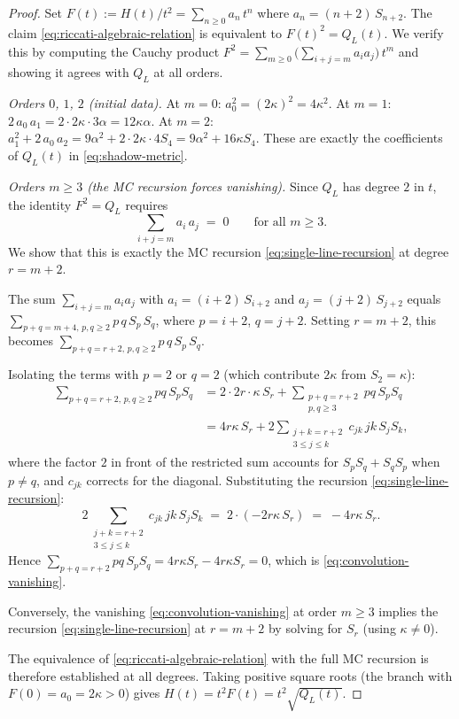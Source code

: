 \documentclass[11pt]{article}
\theoremstyle{plain}
\theoremstyle{definition}
\theoremstyle{remark}
\begin{document}
\begin{proof}
Set $F(t) := H(t)/t^2 = \sum_{n \geq 0} a_n \, t^n$ where
$a_n = (n+2)\, S_{n+2}$.
The claim \eqref{eq:riccati-algebraic-relation} is equivalent to
$F(t)^2 = Q_L(t)$. We verify this by computing the Cauchy
product $F^2 = \sum_{m \geq 0} \bigl(\sum_{i+j=m} a_i a_j\bigr)
\, t^m$ and showing it agrees with $Q_L$ at all orders.

\emph{Orders $0$, $1$, $2$ (initial data).}
At $m = 0$: $a_0^2 = (2\kappa)^2 = 4\kappa^2$.
At $m = 1$: $2\,a_0\,a_1 = 2 \cdot 2\kappa \cdot 3\alpha = 12\kappa\alpha$.
At $m = 2$: $a_1^2 + 2\,a_0\,a_2 = 9\alpha^2 + 2 \cdot 2\kappa \cdot 4S_4
= 9\alpha^2 + 16\kappa S_4$.
These are exactly the coefficients of $Q_L(t)$ in
\eqref{eq:shadow-metric}.

\emph{Orders $m \geq 3$ (the MC recursion forces vanishing).}
Since $Q_L$ has degree $2$ in $t$, the identity $F^2 = Q_L$ requires
\begin{equation}
\label{eq:convolution-vanishing}
 \sum_{i + j = m} a_i \, a_j \;=\; 0
 \qquad \text{for all } m \geq 3.
\end{equation}
We show that this is exactly the MC recursion
\eqref{eq:single-line-recursion} at degree $r = m + 2$.

The sum $\sum_{i+j=m} a_i a_j$ with
$a_i = (i+2)\,S_{i+2}$ and $a_j = (j+2)\,S_{j+2}$
equals $\sum_{p+q = m+4,\, p,q \geq 2} p\,q\,S_p\,S_q$,
where $p = i+2$, $q = j+2$. Setting $r = m+2$, this becomes
$\sum_{p+q = r+2,\, p,q \geq 2} p\,q\,S_p\,S_q$.

Isolating the terms with $p = 2$ or $q = 2$
(which contribute $2\kappa$ from $S_2 = \kappa$):
\begin{align*}
 \sum_{p+q=r+2,\, p,q \geq 2} pq\,S_p S_q
 &= 2 \cdot 2r \cdot \kappa\,S_r
 + \sum_{\substack{p+q=r+2 \\ p,q \geq 3}} pq\,S_p S_q \\
 &= 4r\kappa\,S_r
 + 2\!\!\sum_{\substack{j+k=r+2 \\ 3 \leq j \leq k}}\!\!
 c_{jk}\,jk\,S_j S_k,
\end{align*}
where the factor $2$ in front of the restricted sum accounts for
$S_p S_q + S_q S_p$ when $p \neq q$, and $c_{jk}$ corrects
for the diagonal. Substituting the recursion
\eqref{eq:single-line-recursion}:
\[
 2\!\!\sum_{\substack{j+k=r+2 \\ 3 \leq j \leq k}}\!\!
 c_{jk}\,jk\,S_j S_k
 \;=\;
 2 \cdot (-2r\kappa\,S_r)
 \;=\;
 -4r\kappa\,S_r.
\]
Hence $\sum_{p+q=r+2} pq\,S_p S_q = 4r\kappa S_r - 4r\kappa S_r = 0$,
which is \eqref{eq:convolution-vanishing}.

Conversely, the vanishing \eqref{eq:convolution-vanishing} at
order $m \geq 3$ implies the recursion
\eqref{eq:single-line-recursion} at $r = m+2$ by solving for
$S_r$ (using $\kappa \neq 0$).

The equivalence of \eqref{eq:riccati-algebraic-relation} with
the full MC recursion is therefore established at all degrees.
Taking positive square roots (the branch with $F(0) = a_0 = 2\kappa > 0$)
gives $H(t) = t^2 F(t) = t^2 \sqrt{Q_L(t)}$.
\end{proof}
\end{document}
